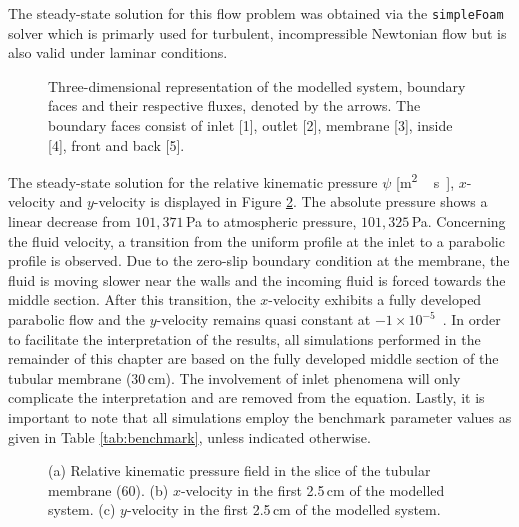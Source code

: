 The steady-state solution for this flow problem was obtained via the \texttt{simpleFoam} solver which is primarly used for turbulent, incompressible Newtonian flow but is also valid under laminar conditions.

\begin{figure}[H]
\centering
 \def\svgwidth{0.8\columnwidth}
 
 \caption{Three-dimensional representation of the modelled system, boundary faces and their respective fluxes, denoted by the arrows. The boundary faces consist of inlet [1], outlet [2], membrane [3], inside [4], front and back [5]. \label{fig:tube}}
\end{figure}


The steady-state solution for the relative kinematic pressure $\psi$ [\unit{\metre\squared\,\second\rpsquared}], $x$-velocity and $y$-velocity is displayed in Figure \ref{fig:CFDTube}.
The absolute pressure shows a linear decrease from $101,371$\,Pa to atmospheric pressure, $101,325$\,Pa. Concerning the fluid velocity, a transition from the uniform profile at the inlet to a parabolic profile is observed. Due to the zero-slip boundary condition at the membrane, the fluid is moving slower near the walls and the incoming fluid is forced towards the middle section. After this transition, the $x$-velocity exhibits a fully developed parabolic flow and the $y$-velocity remains quasi constant at $-1 \times 10^{-5}$ \unit{}{\metre\,\reciprocal\second}. In order to facilitate the interpretation of the results, all simulations performed in the remainder of this chapter are based on the fully developed middle section of the tubular membrane (30\,cm). The involvement of inlet phenomena will only complicate the interpretation and are removed from the equation. Lastly, it is important to note that all simulations employ the benchmark parameter values as given in Table \ref{tab:benchmark}, unless indicated otherwise.
\begin{figure}[H]
    \centerline{
    }
    \centerline{
    }
\caption{(a) Relative kinematic pressure field in the slice of the tubular membrane (\unit{60}{\centi\metre}). (b) $x$-velocity in the first 2.5\,cm of the modelled system. (c) $y$-velocity in the first 2.5\,cm of the modelled system. \label{fig:CFDTube}}
\end{figure}

